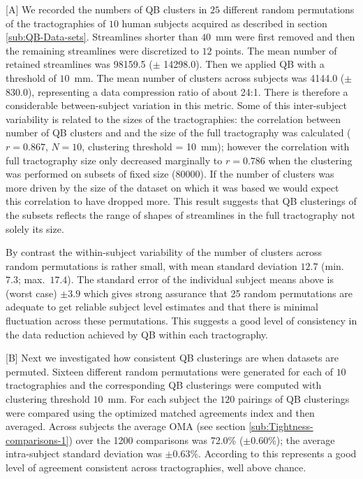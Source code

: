 \documentclass{bioinfo}
\begin{document}
[A] We recorded the numbers of QB clusters in $25$ different random
permutations of the tractographies of $10$ human subjects acquired as
described in section \ref{sub:QB-Data-sets}. Streamlines shorter than
$40$~mm were first removed and then the remaining streamlines were
discretized to $12$ points. The mean number of retained streamlines was
\num{98159.5} ($\pm$ \num{14298.0}). Then we applied QB with a threshold
of $10$~mm. The mean number of clusters across subjects was \num{4144.0}
($\pm$ \num{830.0}), representing a data compression ratio of about
24:1. There is therefore a considerable between-subject variation in
this metric. Some of this inter-subject variability is related to the
sizes of the tractographies: the correlation between number of QB
clusters and and the size of the full tractography was calculated
($r=0.867$, $N=10$, clustering threshold = 10~mm); however the
correlation with full tractography size only decreased marginally to
$r=0.786$ when the clustering was performed on subsets of fixed size
(\num{80000}).  If the number of clusters was more driven by the size of
the dataset on which it was based we would expect this correlation to
have dropped more.  This result suggests that QB clusterings of the
subsets reflects the range of shapes of streamlines in the full
tractography not solely its size.

By contrast the within-subject variability of the number of clusters
across random permutations is rather small, with mean standard deviation
$12.7$ (min.~$7.3$; max.~$17.4$). The standard error of the individual
subject means above is (worst case) $\pm 3.9$ which gives strong
assurance that 25 random permutations are adequate to get reliable
subject level estimates and that there is minimal fluctuation across these
permutations. This suggests a good level of consistency in the data
reduction achieved by QB within each tractography.

[B] Next we investigated how consistent QB clusterings are when datasets
are permuted. Sixteen different random permutations were generated for
each of $10$ tractographies and the corresponding QB clusterings were
computed with clustering threshold $10$~mm. For each subject the $120$
pairings of QB clusterings were compared using the optimized matched
agreements index and then averaged. Across subjects the average OMA (see
section \ref{sub:Tightness-comparisons-1}) over the \num{1200}
comparisons was 72.0\% ($\pm 0.60$\%); the average intra-subject
standard deviation was $\pm 0.63$\%. According to \citet{altman1995}
this represents a good level of agreement consistent across
tractographies, well above chance.
\end{document}
